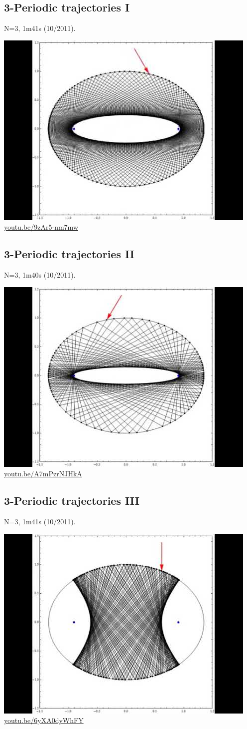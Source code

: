 \documentclass[12pt]{amsart}
\begin{document}
\subsection{3-Periodic trajectories I}
\label{vid:9zAr5-nm7mw}
\noindent N=3, 1m41s (10/2011). 
\begin{center}\includegraphics[width=.5\textwidth]{pics/9zAr5-nm7mw.jpg} \\ 
\href{https://youtu.be/9zAr5-nm7mw}{\url{youtu.be/9zAr5-nm7mw}}\end{center}
% 

\subsection{3-Periodic trajectories II}
\label{vid:A7mPzrNJHkA}
\noindent N=3, 1m40s (10/2011). 
\begin{center}\includegraphics[width=.5\textwidth]{pics/A7mPzrNJHkA.jpg} \\ 
\href{https://youtu.be/A7mPzrNJHkA}{\url{youtu.be/A7mPzrNJHkA}}\end{center}
% 

\subsection{3-Periodic trajectories III}
\label{vid:6yXA0dyWhFY}
\noindent N=3, 1m41s (10/2011). 
\begin{center}\includegraphics[width=.5\textwidth]{pics/6yXA0dyWhFY.jpg} \\ 
\href{https://youtu.be/6yXA0dyWhFY}{\url{youtu.be/6yXA0dyWhFY}}\end{center}
% 
\end{document}
